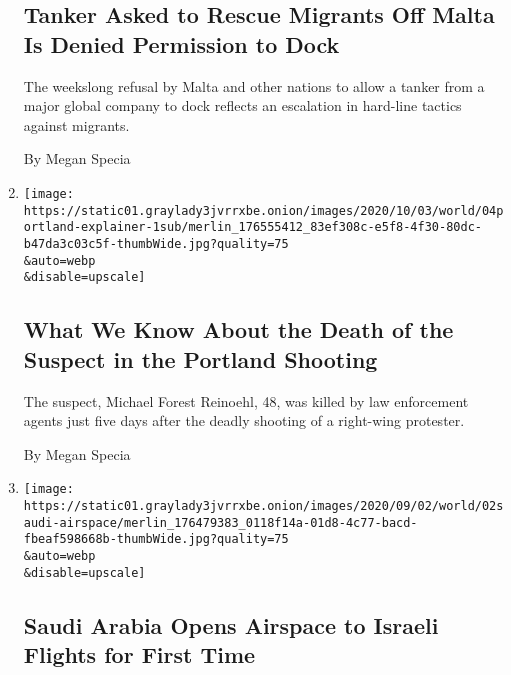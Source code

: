 \begin{enumerate}
  \hypertarget{tanker-asked-to-rescue-migrants-off-malta-is-denied-permission-to-dock}{%
  \subsection{Tanker Asked to Rescue Migrants Off Malta Is Denied
  Permission to
  Dock}\label{tanker-asked-to-rescue-migrants-off-malta-is-denied-permission-to-dock}}

  The weekslong refusal by Malta and other nations to allow a tanker
  from a major global company to dock reflects an escalation in
  hard-line tactics against migrants.

  By Megan Specia
\item
  \href{/2020/09/04/us/michael-forest-reinoehl-portland.html}{}

  \texttt{[image: https://static01.graylady3jvrrxbe.onion/images/2020/10/03/world/04portland-explainer-1sub/merlin\_176555412\_83ef308c-e5f8-4f30-80dc-b47da3c03c5f-thumbWide.jpg?quality=75\\\&auto=webp\\\&disable=upscale]}

  \hypertarget{what-we-know-about-the-death-of-the-suspect-in-the-portland-shooting}{%
  \subsection{What We Know About the Death of the Suspect in the
  Portland
  Shooting}\label{what-we-know-about-the-death-of-the-suspect-in-the-portland-shooting}}

  The suspect, Michael Forest Reinoehl, 48, was killed by law
  enforcement agents just five days after the deadly shooting of a
  right-wing protester.

  By Megan Specia
\item
  \href{/2020/09/02/world/middleeast/saudi-airspace-israel-uae.html}{}

  \texttt{[image: https://static01.graylady3jvrrxbe.onion/images/2020/09/02/world/02saudi-airspace/merlin\_176479383\_0118f14a-01d8-4c77-bacd-fbeaf598668b-thumbWide.jpg?quality=75\\\&auto=webp\\\&disable=upscale]}

  \hypertarget{saudi-arabia-opens-airspace-to-israeli-flights-for-first-time}{%
  \subsection{Saudi Arabia Opens Airspace to Israeli Flights for First
  Time}\label{saudi-arabia-opens-airspace-to-israeli-flights-for-first-time}}


\end{enumerate}
